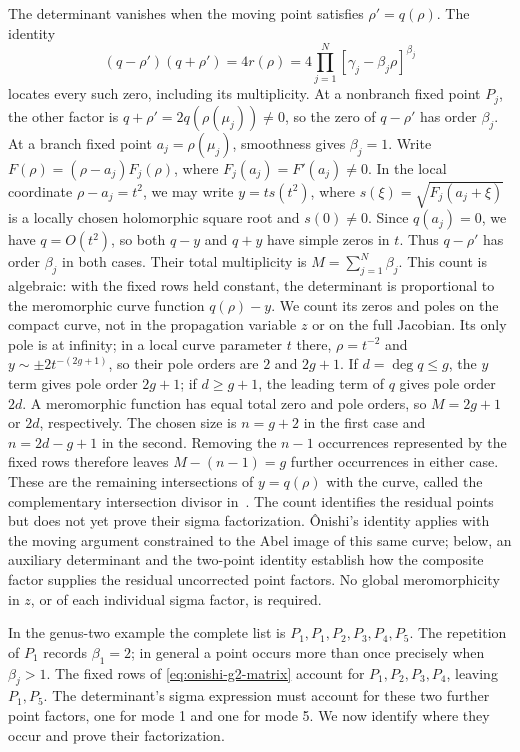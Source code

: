 \documentclass[11pt]{article}
\begin{document}
The determinant vanishes when the moving point satisfies $\rho'=q(\rho)$. The identity
\[
(q-\rho')(q+\rho')=4r(\rho)
 =4\prod_{j=1}^{N}[\gamma_j-\beta_j\rho]^{\beta_j}
\]
locates every such zero, including its multiplicity. At a nonbranch fixed point $P_j$, the other factor is $q+\rho'=2q(\rho(\mu_j))\ne0$, so the zero of $q-\rho'$ has order $\beta_j$. At a branch fixed point $a_j=\rho(\mu_j)$, smoothness gives $\beta_j=1$. Write $F(\rho)=(\rho-a_j)F_j(\rho)$, where $F_j(a_j)=F'(a_j)\ne0$. In the local coordinate $\rho-a_j=t^2$, we may write $y=t s(t^2)$, where $s(\xi)=\sqrt{F_j(a_j+\xi)}$ is a locally chosen holomorphic square root and $s(0)\ne0$. Since $q(a_j)=0$, we have $q=O(t^2)$, so both $q-y$ and $q+y$ have simple zeros in $t$. Thus $q-\rho'$ has order $\beta_j$ in both cases. Their total multiplicity is $M=\sum_{j=1}^{N}\beta_j$. This count is algebraic: with the fixed rows held constant, the determinant is proportional to the meromorphic curve function $q(\rho)-y$. We count its zeros and poles on the compact curve, not in the propagation variable $z$ or on the full Jacobian. Its only pole is at infinity; in a local curve parameter $t$ there, $\rho=t^{-2}$ and $y\sim\pm2t^{-(2g+1)}$, so their pole orders are $2$ and $2g+1$. If $d=\deg q\le g$, the $y$ term gives pole order $2g+1$; if $d\ge g+1$, the leading term of $q$ gives pole order $2d$. A meromorphic function has equal total zero and pole orders, so $M=2g+1$ or $2d$, respectively. The chosen size is $n=g+2$ in the first case and $n=2d-g+1$ in the second. Removing the $n-1$ occurrences represented by the fixed rows therefore leaves $M-(n-1)=g$ further occurrences in either case. These are the remaining intersections of $y=q(\rho)$ with the curve, called the complementary intersection divisor in~\cite[Sections~3.1--3.2]{divisor-addition}. The count identifies the residual points but does not yet prove their sigma factorization. \^Onishi's identity applies with the moving argument constrained to the Abel image of this same curve; below, an auxiliary determinant and the two-point identity establish how the composite factor supplies the residual uncorrected point factors. No global meromorphicity in $z$, or of each individual sigma factor, is required.

In the genus-two example the complete list is $P_1,P_1,P_2,P_3,P_4,P_5$. The repetition of $P_1$ records $\beta_1=2$; in general a point occurs more than once precisely when $\beta_j>1$. The fixed rows of \eqref{eq:onishi-g2-matrix} account for $P_1,P_2,P_3,P_4$, leaving $P_1,P_5$. The determinant's sigma expression must account for these two further point factors, one for mode 1 and one for mode 5. We now identify where they occur and prove their factorization.
\end{document}
